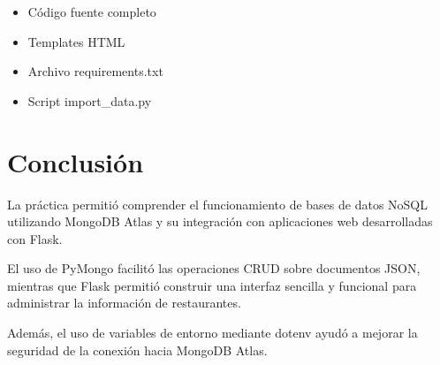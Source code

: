 \documentclass[12pt]{article}
\begin{document}
\begin{itemize}
    \item Código fuente completo
    \item Templates HTML
    \item Archivo requirements.txt
    \item Script import\_data.py
\end{itemize}


\section{Conclusión}

La práctica permitió comprender el funcionamiento de bases de datos NoSQL utilizando MongoDB Atlas y su integración con aplicaciones web desarrolladas con Flask.

El uso de PyMongo facilitó las operaciones CRUD sobre documentos JSON, mientras que Flask permitió construir una interfaz sencilla y funcional para administrar la información de restaurantes.

Además, el uso de variables de entorno mediante dotenv ayudó a mejorar la seguridad de la conexión hacia MongoDB Atlas.
\end{document}
